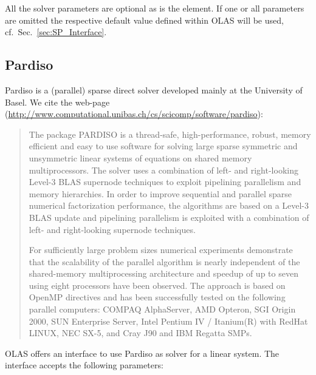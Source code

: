 All the solver parameters are optional as is the  element. If one or
all parameters are omitted the respective default value defined within OLAS
will be used, cf.~Sec.~\ref{sec:SP_Interface}.
%
%
\subsection{Pardiso}
\label{sec:Pardiso}
%
%
Pardiso is a (parallel) sparse direct solver developed mainly at the University
of Basel. We cite the web-page
(\url{http://www.computational.unibas.ch/cs/scicomp/software/pardiso}):
%
%
\begin{quote}
The package PARDISO is a thread-safe, high-performance, robust, memory efficient and easy to use software for solving large sparse symmetric and unsymmetric linear systems of equations on shared memory multiprocessors. The solver uses a combination of left- and right-looking Level-3 BLAS supernode techniques to exploit pipelining parallelism and memory hierarchies. In order to improve sequential and parallel sparse numerical factorization performance, the algorithms are based on a Level-3 BLAS update and pipelining parallelism is exploited with a combination of left- and right-looking supernode techniques.

For sufficiently large problem sizes numerical experiments demonstrate that the scalability of the parallel algorithm is nearly independent of the shared-memory multiprocessing architecture and speedup of up to seven using eight processors have been observed. The approach is based on OpenMP directives and has been successfully tested on the following parallel computers: COMPAQ AlphaServer, AMD Opteron, SGI Origin 2000, SUN Enterprise Server, Intel Pentium IV / Itanium(R) with RedHat LINUX, NEC SX-5, and Cray J90 and IBM Regatta SMPs.
\end{quote}
%
%
OLAS offers an interface to use Pardiso as solver for a linear system. The
interface accepts the following parameters:
%
%
